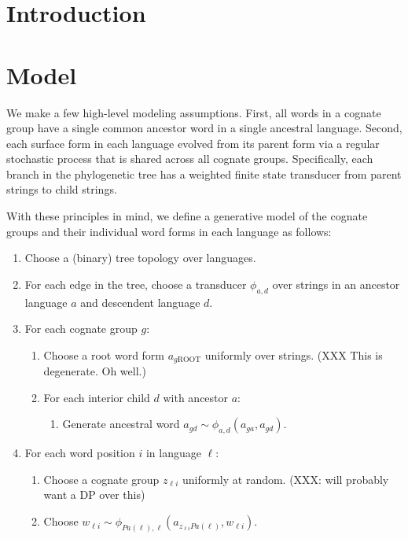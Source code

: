 \documentclass[11pt]{article}
\title{}
\author{}
\date{}
\begin{document}
\maketitle
\begin{abstract}
\end{abstract}
\section{Introduction}
\section{Model}

We make a few high-level modeling assumptions. First, all words in
a cognate group have a single common ancestor word in a single
ancestral language. Second, each surface form in each language
evolved from its parent form via a regular stochastic process that
is shared across all cognate groups. Specifically, each branch in
the phylogenetic tree has a weighted finite state transducer from
parent strings to child strings.

With these principles in mind, we define a generative model of the cognate groups and their individual word forms in each language as follows:
\begin{enumerate}
  \item Choose a (binary) tree topology over languages.
  \item For each edge in the tree, choose a transducer $\phi_{a,d}$ over strings in an ancestor language $a$ and descendent language $d$.
  \item For each cognate group $g$:
    \begin{enumerate}
      \item Choose a root word form $a_{g\mathrm{ROOT}}$ uniformly over strings. (XXX This is degenerate. Oh well.)
      \item For each interior child $d$ with ancestor $a$:
        \begin{enumerate}
          \item Generate ancestral word $a_{gd} \sim \phi_{a,d}(a_{ga},a_{gd})$.
        \end{enumerate}
    \end{enumerate}
  \item For each word position $i$ in language $\ell$:
    \begin{enumerate}
      \item Choose a cognate group $z_{\ell i}$ uniformly at random. (XXX: will probably want a DP over this)
      \item Choose $w_{\ell i} \sim \phi_{Pa(\ell),\ell}(a_{z_{\ell i}Pa(\ell)},w_{\ell i})$.
    \end{enumerate}
\end{enumerate}
\end{document}

